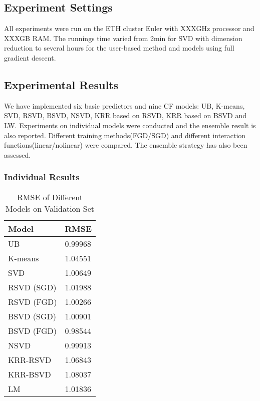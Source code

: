 \documentclass[10pt,conference,compsocconf]{IEEEtran}
\begin{document}
\subsection{Experiment Settings}
All experiments were run on the ETH cluster Euler with XXXGHz processor and XXXGB RAM. The runnings time varied from 2min for SVD with dimension reduction to several hours for the user-based method and models using full gradient descent.

\subsection{Experimental Results}
We have implemented six basic predictors and nine CF models: UB, K-means, SVD, RSVD, BSVD, NSVD, KRR based on RSVD, KRR based on BSVD and LW. Experiments on individual models were conducted and the ensemble result is also reported. Different training methods(FGD/SGD) and different interaction
functions(linear/nolinear) were compared. The ensemble strategy has also been assessed.

\subsubsection{Individual Results}
\begin{table*}[htbp]
  \centering
  \begin{tabular}[c]{|l||l|}
    \hline
    Model&RMSE\\
    \hline
    UB&0.99968\\
    K-means&1.04551\\
    SVD&1.00649\\
    RSVD (SGD)&1.01988\\
    RSVD (FGD)&1.00266\\
    BSVD (SGD)&1.00901\\
    BSVD (FGD)&0.98544\\
    NSVD&0.99913\\
    KRR-RSVD&1.06843\\
    KRR-BSVD&1.08037\\
    LM&1.01836\\
    \hline
  \end{tabular}
    \caption{  \label{mytable} RMSE of Different Models on Validation Set}
\end{table*}
\end{document}
